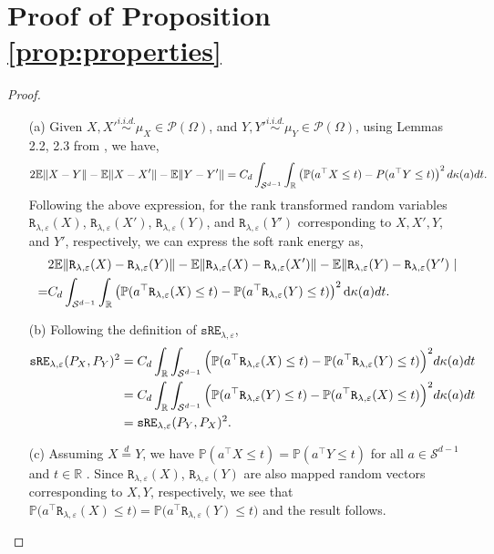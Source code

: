 \documentclass{article}
\theoremstyle{definition}
\newcommand{\pr}{\mathbb{P}}
\newcommand{\sR}{\mathtt{R}_{\lambda,\varepsilon}}
\newcommand{\sRE}{\mathtt{sRE}_{\lambda,\varepsilon}}
\newcommand{\sre}{\mathtt{sRE}}
\begin{document}
\section{Proof of Proposition \ref{prop:properties}}\label{supp:properties}
\begin{proof}

\begin{itemize}
\setlength \itemsep{3mm}
    \item[(a)] Given $ X, X'\overset{i.i.d.}{\sim} \mu_{X}\in \mathcal P(\Omega)$, and $ Y, Y'\overset{i.i.d.}{\sim} \mu_{Y}\in \mathcal P(\Omega)$, using Lemmas 2.2, 2.3 from \cite{baringhaus2004new}, we have,
    \begin{align*}
        2\mathbb E\|X -  Y\|-\mathbb E\|    X -     X'\|-\mathbb E\| Y- Y'\|\notag = C_d\int_{\mathcal S^{d-1}}\int_{\mathbb R} \left ( \mathbb{P}(   a^\top   X \leq t) -  P(  a^\top    Y \leq t)\right )^2 d\kappa(a) dt.
    \end{align*}
    Following the above expression, for the rank transformed random variables $\sR(X)$, $\sR(X')$, $\sR(Y)$, and $\sR(  Y')$ corresponding to $  X, X', Y$, and $Y'$, respectively, we can express the soft rank energy as,  
     \begin{align*}
        &2\mathbb E\| \sR(X) -  \sR(Y)\|- \mathbb E\|  \sR(X) -   \sR(X')\|-\mathbb E\|  \sR(Y) -   \sR(Y')\ |\notag \\ 
        =& C_d \int_{\mathcal S^{d-1}}\int_{\mathbb R} \left ( \mathbb P(a^\top \sR(X) \leq t) -\mathbb P(a^\top  \sR(Y) \leq t)\right )^2 \text d\kappa(a)dt.
    \end{align*}
    
    \item [(b)] Following the definition of $\sre_{\lambda,\varepsilon}$,
    \begin{align*}
        \sRE(P_X,P_Y)^2 &=C_d  \int_{\mathbb R} \int_{\mathcal S^{d-1}} \Big( \mathbb{P}(  a^\top  \sR(X)\leq t)
        - \mathbb{P}(a^\top \sR(Y)\leq t)\Big)^2 d\kappa( a) dt \notag\\
        & =C_d  \int_{\mathbb R} \int_{\mathcal S^{d-1}} \Big( \mathbb{P}(a^\top \sR(  Y)\leq t)
        - \mathbb{P}( a^\top \sR(X)\leq t)\Big)^2 d\kappa(a) dt \notag \\
        & = \sre_{\lambda,\varepsilon}(P_Y,P_X)^2. 
    \end{align*}
    \item [(c)] Assuming $X \overset{d}{=}Y$, we have $\mathbb{P}(a^\top X\leq t)=\mathbb{P}(a^\top Y\leq t)$ for all $a\in \mathcal S^{d-1}$ and $t\in \mathbb R$ \cite{baringhaus2004new}. Since $\sR(X)$, $\sR(Y)$ are also mapped random vectors corresponding to $X, Y$, respectively, we see that $\pr\big(a^\top\sR(X)\leq t\big) =\pr\big(a^\top\sR(Y)\leq t\big)$ and the result follows. 
\end{itemize}
\end{proof}
\end{document}
